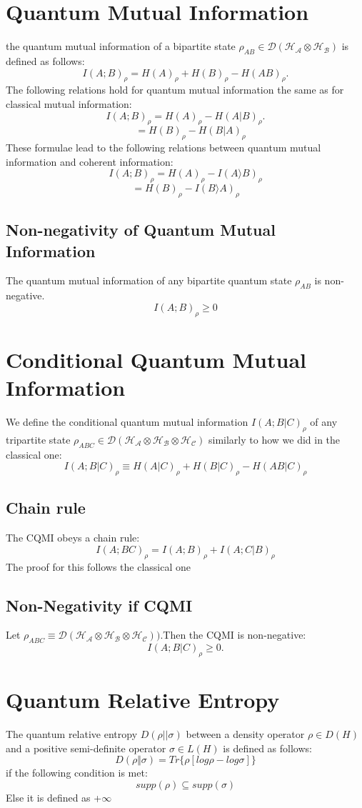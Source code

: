 \section{Quantum Mutual Information}
the quantum mutual information of a bipartite state $\rho_{AB} \in \mathcal{D}(\mathcal{H_A} \otimes \mathcal{H_B})$ is defined as follows:
\[
I(A;B)_\rho = H(A)_\rho + H(B)_\rho - H(AB)_\rho.
\]
The following relations hold for quantum mutual information the same as for classical mutual information:
\[
I(A;B)_\rho = H(A)_\rho - H(A|B)_\rho.
\]
\[
            \quad = H(B)_\rho - H(B|A)_\rho
\]
These formulae lead to the following relations between quantum mutual information and coherent information:
\[
I(A;B)_\rho = H(A)_\rho - I(A\rangle{}B)_\rho
\]
\[
 = H(B)_\rho - I(B\rangle{}A)_\rho
\]

\subsection{Non-negativity of Quantum Mutual Information}
The quantum mutual information of any bipartite quantum state $\rho_{AB}$ is non-negative.
\[
I(A;B)_\rho \geq 0
\]


\section{Conditional Quantum Mutual Information}
We define the conditional quantum mutual information $I(A;B|C)_\rho$ of any tripartite state $\rho_{ABC} \in \mathcal{D}(\mathcal{H_A} \otimes \mathcal{H_B} \otimes \mathcal{H_C})$ similarly to how we did in the classical one:
\[
I(A;B|C)_\rho \equiv H(A|C)_\rho + H(B|C)_\rho - H(AB|C)_\rho
\]

\subsection{Chain rule}
The CQMI obeys a chain rule:
\[
I(A;BC)_\rho = I(A;B)_\rho + I(A;C|B)_\rho
\]
The proof for this follows the classical one


\subsection{Non-Negativity if CQMI}
Let $\rho _{ABC} \equiv \mathcal{D}(\mathcal{H_A} \otimes \mathcal{H_B} \otimes \mathcal{H_C}))$.Then the CQMI is non-negative:
\[
I(A;B|C)_\rho \geq 0.
\]

\section{Quantum Relative Entropy}
The quantum relative entropy $D(\rho||\sigma)$ between a density operator $\rho \in D(H)$ and a positive semi-definite operator $\sigma \in L(H)$ is defined as follows:
\[
D(\rho \Vert \sigma) = Tr\{\rho[log\rho - log\sigma]\}
\]
if the following condition is met:
\[
supp(\rho) \subseteq supp(\sigma)
\]
Else it is defined as +$\infty$
\newline
\newline

